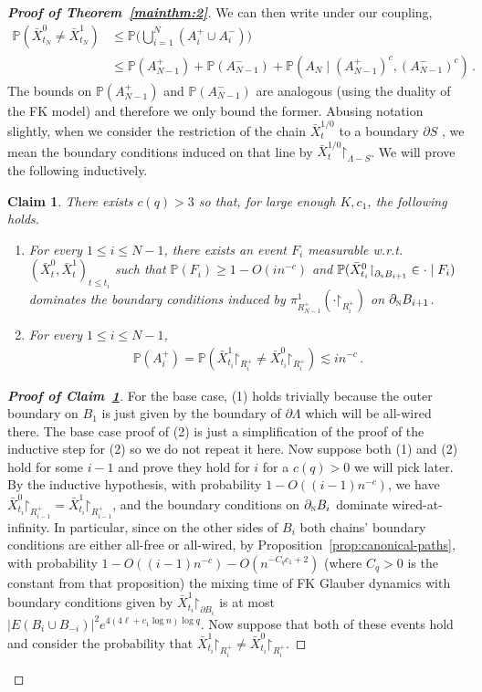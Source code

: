 \documentclass[reqno,11pt]{amsart}
\numberwithin{equation}{section}
\renewcommand{\restriction}{\mathord{\upharpoonright}}
\newtheorem{claim}[theorem]{Claim}
\theoremstyle{definition}{
\newtheorem{example}[theorem]{Example}
\newtheorem{definition}[theorem]{Definition}
\newtheorem*{definition*}{Definition}
\newtheorem{problem}[theorem]{Problem}
\newtheorem{question}[theorem]{Question}
\newtheorem{remark}[theorem]{Remark}
}
\renewcommand{\P}{\mathbb P}
\newcommand{\north}{{\textsc{n}}}
\begin{document}
\begin{proof}[\textbf{\emph{Proof of Theorem~\ref{mainthm:2}}}]
We can then write under our coupling, 
\begin{align*}
\P(\bar X_{t_{N}}^0 \neq \bar X_{t_{N}}^1) & \leq \P\bigg(\bigcup_{i=1}^{N} (A_i^+ \cup A_i^-)\bigg) \\
& \leq \P(A_{N-1}^+) + \P (A_{N-1}^-)+\P(A_N\mid (A_{N-1}^{+})^c,(A_{N-1}^-)^c)\,.
\end{align*}
The bounds on $\P(A_{N-1}^+)$ and $\P(A_{N-1}^-)$ are analogous (using the duality of the FK model) and therefore we only bound the former. Abusing notation slightly, when we consider the restriction of the chain $\bar X_t^{1/0}$ to a boundary $\partial S$ , we mean the boundary conditions induced on that line by $\bar X_{t}^{1/0}\restriction_{\Lambda-S}$. 
We will prove the following inductively.
\begin{claim}\label{claim:induction1}
There exists $c(q)>3$ so that, for large enough $K, c_1$, the following holds.
\begin{enumerate}[(1)]
	\item For every $1\leq i \leq N-1$,
	there exists an event $F_i$ measurable w.r.t.\ $(\bar X_t^0,\bar X_t^1)_{t\leq t_i}$ such that $\mathbb P(F_i) \geq 1-O(in^{-c})$ and $\mathbb P(\bar X_{t_{i}}^{0} \restriction_{\partial_\north B_{i+1}} \in \cdot \mid F_i)$ dominates the boundary conditions induced by $\pi_{R_{N-1}^+}^{1}(\cdot \restriction_{R_{i}^+})$ on $\partial_\north B_{i+1}$.
	\item For every $1\leq i \leq N-1$, \begin{align*}
\mathbb P(A_{i}^+)= \mathbb P(\bar X_{t_{i}}^1\restriction_{R_i^+} \neq \bar X_{t_{i}}^0\restriction_{R_i^+}) \lesssim i n^{-c} \,.
\end{align*}
\end{enumerate} 
\end{claim}
\begin{proof}[\textbf{\emph{Proof of Claim~\ref{claim:induction1}}}]For the base case, (1) holds trivially because the outer boundary on $B_1$ is just given by the boundary of $\partial \Lambda$ which will be all-wired there. The base case proof of (2) is just a simplification of the proof of the inductive step for (2) so we do not repeat it here. 
Now suppose both (1) and (2) hold for some $i-1$ and prove they hold for $i$ for a $c(q)>0$ we will pick later. By the inductive hypothesis, with probability $1-O((i-1)n^{-c})$, we have $\bar X_{t_{i}}^0 \restriction_{R_{i-1}^+} = \bar X_{t_{i}}^1 \restriction_{R_{i-1}^+}$, and the boundary conditions on $\partial_\north B_{i}$ dominate wired-at-infinity. In particular, since on the other sides of $B_{i}$ both chains' boundary conditions are either all-free or all-wired, by Proposition~\ref{prop:canonical-paths}, with probability $1-O((i-1)n^{-c})-O(n^{-C_q c_1+2})$ (where $C_q>0$ is the constant from that proposition) the mixing time of FK Glauber dynamics with boundary conditions given by $\bar X_{t_{i}}^1\restriction_{\partial B_{i}}$ is at most $|E(B_i\cup B_{-i})|^2 e^{4(4\ell+ c_1\log n) \log q}$. Now suppose that both of these events hold and consider the probability that $\bar X_{t_{i}}^1\restriction_{R_i^+} \neq \bar X_{t_{i}}^0\restriction_{R_i^+}$.


\end{proof}
\end{proof}
\end{document}
